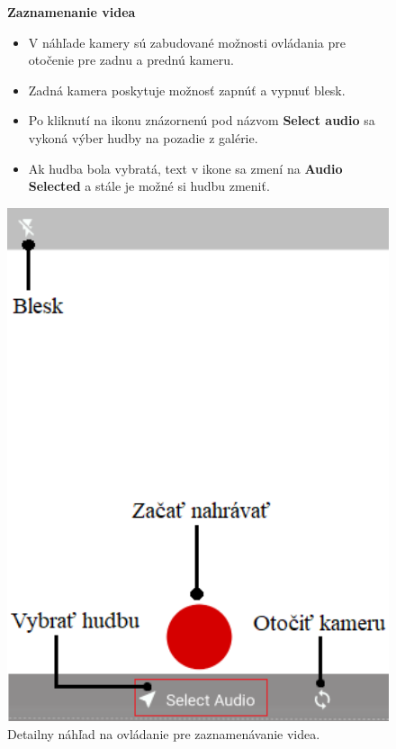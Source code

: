 \documentclass[12pt, oneside]{book}
\begin{document}
\begin{figure}[H]
\begin{minipage}[b]{0.55\linewidth}

    \hspace{15pt} \textbf{Zaznamenanie videa}

    \begin{itemize}
        \item V náhľade kamery sú zabudované možnosti ovládania pre otočenie pre zadnu a prednú kameru.
        \item Zadná kamera poskytuje možnosť zapnúť a vypnuť blesk.
        \item Po kliknutí na ikonu znázornenú pod názvom \textbf{Select audio} sa vykoná výber hudby na pozadie z galérie.
        \item Ak hudba bola vybratá, text v ikone sa zmení na \textbf{Audio Selected} a stále je možné si hudbu zmeniť.
    \end{itemize}
   

    \hspace{15pt} 
    
\end{minipage}
\hspace{0.5cm}
\begin{minipage}[b]{0.35\linewidth}
  \includegraphics[width=1\textwidth]{images/rec.png}
    \caption{Detailny náhľad na ovládanie pre zaznamenávanie videa. }
    \label{fig:obr11}
\end{minipage}



\end{figure}
\end{document}
